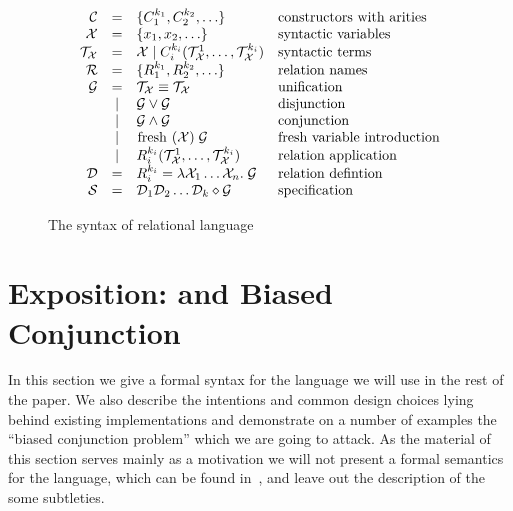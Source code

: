 \begin{figure}[t]
\[
  \begin{array}{rcll}
     \mathcal{C} & = & \{ C_1^{k_1}, C_2^{k_2}, \ldots \} 
     & \mbox{constructors with arities} 
     \\
     \mathcal{X} & = & \{x_1, x_2, \ldots \} 
     & \mbox{syntactic variables} 
     \\
     \mathcal{T}_\mathcal{X} & = & \mathcal{X} \mid C_i^{k_i}(\mathcal{T}_\mathcal{X}^1, \ldots, \mathcal{T}_\mathcal{X}^{k_i})
     & \mbox{syntactic terms} 
     \\
     \mathcal{R} & = & \{R_1^{k_1}, R_2^{k_2}, \ldots \} 
     & \mbox{relation names} 
     \\
     \mathcal{G} & =    & \mathcal{T}_\mathcal{X} \equiv \mathcal{T}_\mathcal{X} & \mbox{unification} \\
                 & \mid & \mathcal{G} \lor \mathcal{G} & \mbox{disjunction} \\
                 & \mid & \mathcal{G} \land \mathcal{G} & \mbox{conjunction} \\
                 & \mid & \mbox{\lstinline|fresh|} \; (\mathcal{X}) \; \mathcal{G} & \mbox{fresh variable introduction} \\
                 & \mid & R_i^{k_i}(\mathcal{T}_\mathcal{X}^1, \ldots, \mathcal{T}_\mathcal{X}^{k_i}) & \mbox{relation application} \\
    \mathcal{D} & = &R_i^{k_i} = \lambda \mathcal{X}_1 \ldots \mathcal{X}_n. \; \mathcal{G} & \mbox{relation defintion}\\
    \mathcal{S} & = &\mathcal{D}_1\mathcal{D}_2\dots\mathcal{D}_k \diamond \mathcal{G} & \mbox{specification}
  \end{array}
\]
    \caption{The syntax of relational language}
    \label{syntax}
\end{figure}

\section{Exposition: \mk and Biased Conjunction}
\label{sec:exposition}

In this section we give a formal syntax for the language we will use in the rest of the paper. We also describe the intentions and common design
choices lying behind existing implementations and demonstrate on a number of examples the ``biased conjunction problem'' which we are going to attack.
As the material of this section serves mainly as a motivation we will not present a formal semantics for the language, which can be found in~\cite{fair:semantics},
and leave out the description of the some subtleties.

